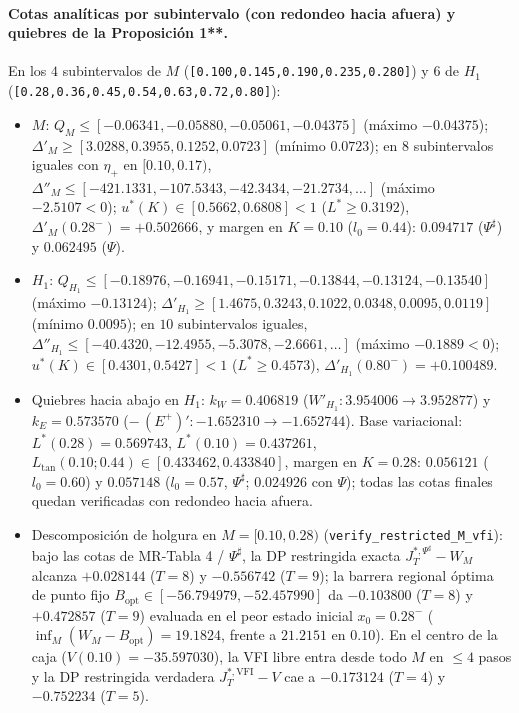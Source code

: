 \documentclass[11pt,letterpaper]{article}
\theoremstyle{plain}
\begin{document}
\paragraph{Cotas analíticas por subintervalo (con redondeo hacia afuera) y quiebres de la Proposición 1**.}
En los $4$ subintervalos de $M$ (\texttt{[0.100,0.145,0.190,0.235,0.280]}) y $6$ de $H_1$ (\texttt{[0.28,0.36,0.45,0.54,0.63,0.72,0.80]}):
\begin{itemize}
\item $M$: $Q_M\le [-0.06341, -0.05880, -0.05061, -0.04375]$ (máximo $-0.04375$); $\Delta'_M\ge [3.0288, 0.3955, 0.1252, 0.0723]$ (mínimo $0.0723$); en $8$ subintervalos iguales con $\eta_+$ en $[0.10,0.17)$, $\Delta''_M\le [-421.1331, -107.5343, -42.3434, -21.2734, \dots]$ (máximo $-2.5107<0$); $u^*(K)\in[0.5662, 0.6808]<1$ ($L^*\ge 0.3192$), $\Delta'_M(0.28^-)=+0.502666$, y margen en $K=0.10$ ($l_0=0.44$): $0.094717$ ($\Psi^\sharp$) y $0.062495$ ($\Psi$).
\item $H_1$: $Q_{H_1}\le [-0.18976, -0.16941, -0.15171, -0.13844, -0.13124, -0.13540]$ (máximo $-0.13124$); $\Delta'_{H_1}\ge [1.4675, 0.3243, 0.1022, 0.0348, 0.0095, 0.0119]$ (mínimo $0.0095$); en $10$ subintervalos iguales, $\Delta''_{H_1}\le [-40.4320, -12.4955, -5.3078, -2.6661, \dots]$ (máximo $-0.1889<0$); $u^*(K)\in[0.4301, 0.5427]<1$ ($L^*\ge 0.4573$), $\Delta'_{H_1}(0.80^-)=+0.100489$.
\item Quiebres hacia abajo en $H_1$: $k_W=0.406819$ ($W'_{H_1}: 3.954006\to 3.952877$) y $k_E=0.573570$ ($-\,(E^+)': -1.652310\to -1.652744$). Base variacional: $L^*(0.28)=0.569743$, $L^*(0.10)=0.437261$, $L_{\mathrm{tan}}(0.10;0.44)\in[0.433462,0.433840]$, margen en $K=0.28$: $0.056121$ ($l_0=0.60$) y $0.057148$ ($l_0=0.57$, $\Psi^\sharp$; $0.024926$ con $\Psi$); todas las cotas finales quedan verificadas con redondeo hacia afuera.
\item Descomposición de holgura en $M=[0.10,0.28)$ (\texttt{verify\_restricted\_M\_vfi}): bajo las cotas de MR-Tabla 4 / $\Psi^\sharp$, la DP restringida exacta $J_T^{*,\Psi^\sharp}-W_M$ alcanza $+0.028144$ ($T=8$) y $-0.556742$ ($T=9$); la barrera regional óptima de punto fijo $B_{\mathrm{opt}}\in[-56.794979,-52.457990]$ da $-0.103800$ ($T=8$) y $+0.472857$ ($T=9$) evaluada en el peor estado inicial $x_0=0.28^-$ ($\inf_M(W_M-B_{\mathrm{opt}})=19.1824$, frente a $21.2151$ en $0.10$). En el centro de la caja ($V(0.10)=-35.597030$), la VFI libre entra desde todo $M$ en $\le 4$ pasos y la DP restringida verdadera $J_T^{*,\mathrm{VFI}}-V$ cae a $-0.173124$ ($T=4$) y $-0.752234$ ($T=5$).
\end{itemize}
\end{document}
